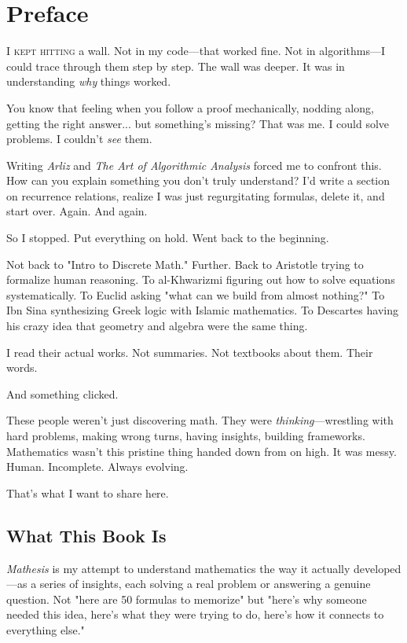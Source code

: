 \chapter*{Preface}

\lettrine{I}{  kept hitting} a wall. Not in my code—that worked fine. Not in algorithms—I could trace through them step by step. The wall was deeper. It was in understanding \textit{why} things worked.

You know that feeling when you follow a proof mechanically, nodding along, getting the right answer... but something's missing? That was me. I could solve problems. I couldn't \textit{see} them.

Writing \textit{Arliz} and \textit{The Art of Algorithmic Analysis} forced me to confront this. How can you explain something you don't truly understand? I'd write a section on recurrence relations, realize I was just regurgitating formulas, delete it, and start over. Again. And again.

So I stopped. Put everything on hold. Went back to the beginning.

Not back to "Intro to Discrete Math." Further. Back to Aristotle trying to formalize human reasoning. To al-Khwarizmi figuring out how to solve equations systematically. To Euclid asking "what can we build from almost nothing?" To Ibn Sina synthesizing Greek logic with Islamic mathematics. To Descartes having his crazy idea that geometry and algebra were the same thing.

I read their actual works. Not summaries. Not textbooks about them. Their words.

And something clicked.

These people weren't just discovering math. They were \textit{thinking}—wrestling with hard problems, making wrong turns, having insights, building frameworks. Mathematics wasn't this pristine thing handed down from on high. It was messy. Human. Incomplete. Always evolving.

That's what I want to share here.

\section*{What This Book Is}

\textit{Mathesis} is my attempt to understand mathematics the way it actually developed—as a series of insights, each solving a real problem or answering a genuine question. Not "here are 50 formulas to memorize" but "here's why someone needed this idea, here's what they were trying to do, here's how it connects to everything else."


